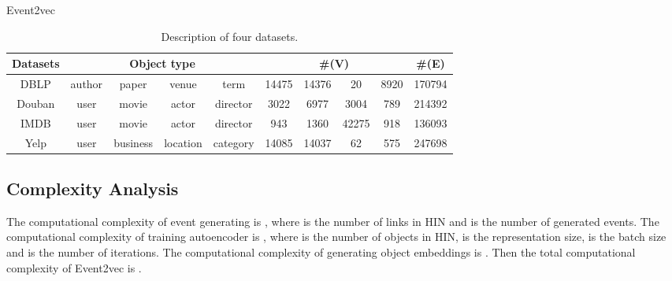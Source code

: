 \begin{algorithm}
	\DontPrintSemicolon
	\caption{Event2vec}\label{algorithm2}
\end{algorithm}

\begin{table*}
	\centering
	\caption{{\small Description of four datasets.}}\label{table1}
	\begin{tabular}{|c|c|c|c|c|c|c|c|c|c|}
		\toprule
		Datasets & \multicolumn{4}{|c|}{Object type} & \multicolumn{4}{|c|}{\#(V)} & \#(E) \\
		\midrule
		DBLP & author & paper & venue & term & 14475 & 14376 & 20 & 8920 & 170794 \\
		Douban & user & movie & actor & director & 3022 & 6977 & 3004 & 789 & 214392 \\
		IMDB & user & movie & actor & director & 943 & 1360 & 42275 & 918 & 136093\\
		Yelp & user & business & location & category & 14085 & 14037 & 62 & 575 & 247698 \\
		\bottomrule
	\end{tabular}
\end{table*}

\subsection{Complexity Analysis}\label{complexity}
The computational complexity of event generating is , where  is the number of links in HIN and  is the number of generated events. The computational complexity of training autoencoder is , where  is the number of objects in HIN,  is the representation size,  is the batch size and  is the number of iterations. The computational complexity of generating object embeddings is . Then the total computational complexity of Event2vec is .

